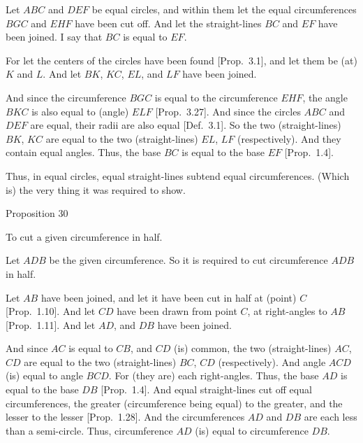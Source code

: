 \epsfysize=1.7in
\centerline{}

Let $ABC$ and $DEF$ be equal circles, and within them let the equal circumferences $BGC$ and $EHF$ have been cut off. And let the straight-lines $BC$ and $EF$ have been joined. I say that $BC$ is equal to $EF$.

For let the centers of the circles have been found [Prop.~3.1], and
let them be (at) $K$ and $L$. And let $BK$, $KC$, $EL$, and $LF$ have been joined.

And since the circumference $BGC$ is equal to the circumference $EHF$,
the angle $BKC$ is also equal to (angle) $ELF$ [Prop.~3.27]. And since the circles
$ABC$ and $DEF$ are equal, their radii are also equal [Def.~3.1]. 
So the two (straight-lines) $BK$, $KC$ are equal to the two (straight-lines)
$EL$, $LF$ (respectively). And they contain equal angles. Thus, the
base $BC$ is equal to the base $EF$ [Prop.~1.4].

Thus,  in equal circles, equal straight-lines subtend equal circumferences.
(Which is) the very thing it was required to show.


\begin{center}
{\large Proposition 30}
\end{center}

To cut a given circumference in half.

\epsfysize=1.3in
\centerline{}

Let $ADB$ be the given circumference. So it is required to cut circumference
$ADB$ in half.

Let $AB$ have been joined, and let it have been cut in half at (point) $C$ [Prop.~1.10]. And let $CD$ have been drawn from point $C$, at right-angles
to $AB$ [Prop.~1.11]. And let $AD$, and $DB$ have been joined.

And since $AC$ is equal to $CB$, and $CD$ (is) common, the two
(straight-lines) $AC$, $CD$ are equal to the two (straight-lines) $BC$, $CD$ (respectively).
And angle $ACD$ (is) equal to angle $BCD$. For (they are) each right-angles.
Thus, the base $AD$ is equal to the base $DB$ [Prop.~1.4]. And equal
straight-lines cut off equal circumferences, the greater (circumference being
equal) to the greater, and the lesser to the lesser [Prop.~1.28].
And the circumferences $AD$ and $DB$ are each less than a semi-circle.
Thus, circumference $AD$ (is) equal to circumference $DB$.

